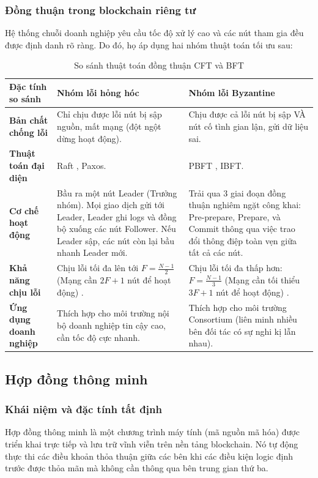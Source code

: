\documentclass[12pt,a4paper]{article}
\begin{document}
\newpage
\subsubsection{Đồng thuận trong blockchain riêng tư}
Hệ thống chuỗi doanh nghiệp yêu cầu tốc độ xử lý cao và các nút tham gia đều được định danh rõ ràng. Do đó, họ áp dụng hai nhóm thuật toán tối ưu sau:

\begin{table}[H]
    \centering
    \renewcommand{\arraystretch}{1.5}
    \begin{tabular}{|p{3.5cm}|p{5.5cm}|p{5.5cm}|}
        \hline
        \textbf{Đặc tính so sánh} & \textbf{Nhóm lỗi hỏng hóc} & \textbf{Nhóm lỗi Byzantine} \\ \hline
        \textbf{Bản chất chống lỗi} & Chỉ chịu được lỗi nút bị sập nguồn, mất mạng (đột ngột dừng hoạt động). & Chịu được cả lỗi nút bị sập VÀ nút cố tình gian lận, gửi dữ liệu sai. \\ \hline
        \textbf{Thuật toán đại diện} & Raft \cite{ongaro}, Paxos. & PBFT \cite{castro}, IBFT. \\ \hline
        \textbf{Cơ chế hoạt động} & Bầu ra một nút Leader (Trưởng nhóm). Mọi giao dịch gửi tới Leader, Leader ghi logs và đồng bộ xuống các nút Follower. Nếu Leader sập, các nút còn lại bầu nhanh Leader mới. & Trải qua 3 giai đoạn đồng thuận nghiêm ngặt công khai: Pre-prepare, Prepare, và Commit thông qua việc trao đổi thông điệp toàn vẹn giữa tất cả các nút. \\ \hline
        \textbf{Khả năng chịu lỗi} & 
Chịu lỗi tối đa lên tới $F = \frac{N-1}{2}$ (Mạng cần $2F + 1$ nút để hoạt động) \cite{ongaro}. & 
Chịu lỗi tối đa thấp hơn: $F = \frac{N-1}{3}$ (Mạng cần tối thiểu $3F + 1$ nút để hoạt động) \cite{lamport, castro}. \\ \hline
        \textbf{Ứng dụng doanh nghiệp} & Thích hợp cho môi trường nội bộ doanh nghiệp tin cậy cao, cần tốc độ cực nhanh. & Thích hợp cho môi trường Consortium (liên minh nhiều bên đối tác có sự nghi kị lẫn nhau). \\ \hline
    \end{tabular}
    \caption{So sánh thuật toán đồng thuận CFT và BFT}
\end{table}

\subsection{Hợp đồng thông minh}

\subsubsection{Khái niệm và đặc tính tất định}
Hợp đồng thông minh là một chương trình máy tính (mã nguồn mã hóa) được triển khai trực tiếp và lưu trữ vĩnh viễn trên nền tảng blockchain. Nó tự động thực thi các điều khoản thỏa thuận giữa các bên khi các điều kiện logic định trước được thỏa mãn mà không cần thông qua bên trung gian thứ ba.
\end{document}
